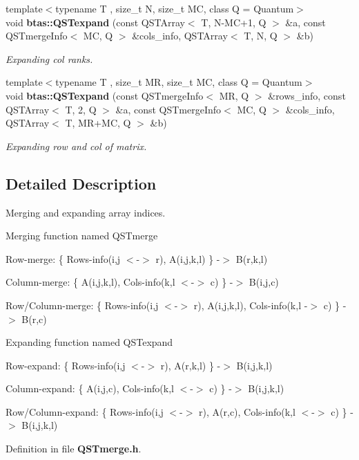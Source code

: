 \begin{DoxyCompactItemize}
{\footnotesize template$<$typename T , size\-\_\-t N, size\-\_\-t M\-C, class Q  = Quantum$>$ }\\void {\bf btas\-::\-Q\-S\-Texpand} (const Q\-S\-T\-Array$<$ T, N-\/M\-C+1, Q $>$ \&a, const Q\-S\-Tmerge\-Info$<$ M\-C, Q $>$ \&cols\-\_\-info, Q\-S\-T\-Array$<$ T, N, Q $>$ \&b)
\begin{DoxyCompactList}\small\item\em Expanding col ranks. \end{DoxyCompactList}\item 
{\footnotesize template$<$typename T , size\-\_\-t M\-R, size\-\_\-t M\-C, class Q  = Quantum$>$ }\\void {\bf btas\-::\-Q\-S\-Texpand} (const Q\-S\-Tmerge\-Info$<$ M\-R, Q $>$ \&rows\-\_\-info, const Q\-S\-T\-Array$<$ T, 2, Q $>$ \&a, const Q\-S\-Tmerge\-Info$<$ M\-C, Q $>$ \&cols\-\_\-info, Q\-S\-T\-Array$<$ T, M\-R+M\-C, Q $>$ \&b)
\begin{DoxyCompactList}\small\item\em Expanding row and col of matrix. \end{DoxyCompactList}\end{DoxyCompactItemize}


\subsection{Detailed Description}
Merging and expanding array indices. \begin{DoxyParagraph}{Merging function named Q\-S\-Tmerge}

\begin{DoxyItemize}
\item Row-\/merge\-: \{ Rows-\/info(i,j $<$-\/$>$ r), A(i,j,k,l) \} -\/$>$ B(r,k,l)
\item Column-\/merge\-: \{ A(i,j,k,l), Cols-\/info(k,l $<$-\/$>$ c) \} -\/$>$ B(i,j,c)
\item Row/\-Column-\/merge\-: \{ Rows-\/info(i,j $<$-\/$>$ r), A(i,j,k,l), Cols-\/info(k,l -\/$>$ c) \} -\/$>$ B(r,c)
\end{DoxyItemize}
\end{DoxyParagraph}
\begin{DoxyParagraph}{Expanding function named Q\-S\-Texpand}

\begin{DoxyItemize}
\item Row-\/expand\-: \{ Rows-\/info(i,j $<$-\/$>$ r), A(r,k,l) \} -\/$>$ B(i,j,k,l)
\item Column-\/expand\-: \{ A(i,j,c), Cols-\/info(k,l $<$-\/$>$ c) \} -\/$>$ B(i,j,k,l)
\item Row/\-Column-\/expand\-: \{ Rows-\/info(i,j $<$-\/$>$ r), A(r,c), Cols-\/info(k,l $<$-\/$>$ c) \} -\/$>$ B(i,j,k,l) 
\end{DoxyItemize}
\end{DoxyParagraph}


Definition in file {\bf Q\-S\-Tmerge.\-h}.

